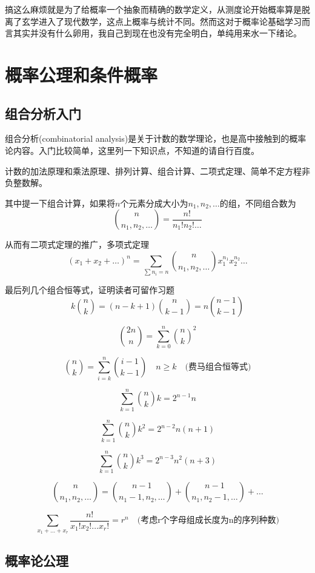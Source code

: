 \documentclass[UTF8]{ctexart}
\begin{document}
搞这么麻烦就是为了给概率一个抽象而精确的数学定义，从测度论开始概率算是脱离了玄学进入了现代数学，这点上概率与统计不同。然而这对于概率论基础学习而言其实并没有什么卵用，我自己到现在也没有完全明白，单纯用来水一下绪论。

\newpage

\section{概率公理和条件概率}

\subsection{组合分析入门}

组合分析(combinatorial analysis)是关于计数的数学理论，也是高中接触到的概率论内容。入门比较简单，这里列一下知识点，不知道的请自行百度。

计数的加法原理和乘法原理、排列计算、组合计算、二项式定理、简单不定方程非负整数解。

其中提一下组合计算，如果将$n$个元素分成大小为$n_{1},n_{2},\ldots$的组，不同组合数为
$$\binom{n}{n_{1},n_{2},\ldots}=\frac{n!}{n_{1}!n_{2}!\ldots}$$

从而有二项式定理的推广，多项式定理
$$(x_{1} + x_{2} + \ldots )^{n}=\sum_{\sum n_{i}=n}\binom{n}{n_{1},n_{2},\ldots} x_{1}^{n_{1}}x_{2}^{n_{2}}\ldots $$

最后列几个组合恒等式，证明读者可留作习题
$$k\displaystyle\binom{n}{k}=(n-k+1)\binom{n}{k-1}=n\binom{n-1}{k-1}$$

$$\displaystyle\binom{2n}{n}=\sum\limits_{k=0}^{n}\binom{n}{k}^{2}$$

$$\displaystyle\binom{n}{k}=\sum\limits_{i=k}^{n}\binom{i-1}{k-1}\quad n\geq k \quad \text{(费马组合恒等式)}$$

$$\displaystyle\sum\limits_{k=1}^{n}\binom{n}{k}k=2^{n-1}n$$

$$\displaystyle\sum\limits_{k=1}^{n}\binom{n}{k}k^{2}=2^{n-2}n(n+1)$$

$$\displaystyle\sum\limits_{k=1}^{n}\binom{n}{k}k^{3}=2^{n-3}n^{2}(n+3)$$

$$\displaystyle\binom{n}{n_{1},n_{2},\ldots}=\binom{n-1}{n_{1}-1,n_{2},\ldots}+\binom{n-1}{n_{1},n_{2}-1,\ldots}+\ldots $$

$$\displaystyle\sum\limits_{x_{1}+\ldots+x_{r}}\frac{n!}{x_{1}!x_{2}!\ldots x_{r}!}=r^{n}\quad \text{(考虑r个字母组成长度为n的序列种数)}$$

\subsection{概率论公理}
\end{document}
